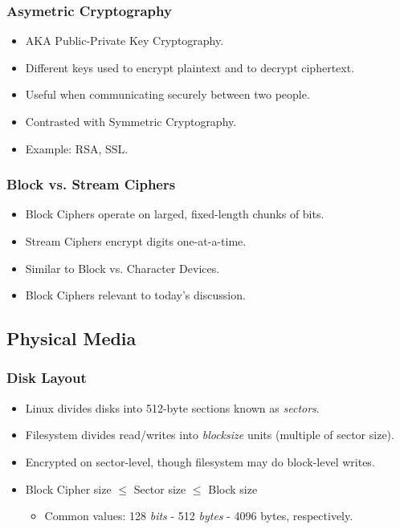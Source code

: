 \documentclass[xcolor={dvipsnames,svgnames},hyperref=dvips]{beamer}
\begin{document}
	\begin{frame}
		\frametitle{Asymetric Cryptography}
		\begin{itemize}
		\item AKA Public-Private Key Cryptography.
		\item Different keys used to encrypt plaintext and to decrypt ciphertext.
		\item Useful when communicating securely between two people.
		\item Contrasted with Symmetric Cryptography.
		\item Example: RSA, SSL.
		\end{itemize}
	\end{frame}

	\begin{frame}
		\frametitle{Block vs. Stream Ciphers}
		\begin{itemize}
		\item Block Ciphers operate on larged, fixed-length chunks of bits.
		\item Stream Ciphers encrypt digits one-at-a-time.
		\item Similar to Block vs. Character Devices.
		\item Block Ciphers relevant to today's discussion.
		\end{itemize}
	\end{frame}

	\subsection{Physical Media}
	\begin{frame}
		\frametitle{Disk Layout}
		\begin{itemize}
		\item Linux divides disks into 512-byte sections known as \textit{sectors}.
		\item Filesystem divides read/writes into \textit{blocksize} units (multiple of sector size).
		\item Encrypted on sector-level, though filesystem may do block-level writes.
		\item Block Cipher size $\leq$ Sector size $\leq$ Block size
			\begin{itemize}
			\item Common values: 128 \textit{bits} - 512 \textit{bytes} - 4096 bytes, respectively.
			\end{itemize}
		\end{itemize}
	\end{frame}
\end{document}
